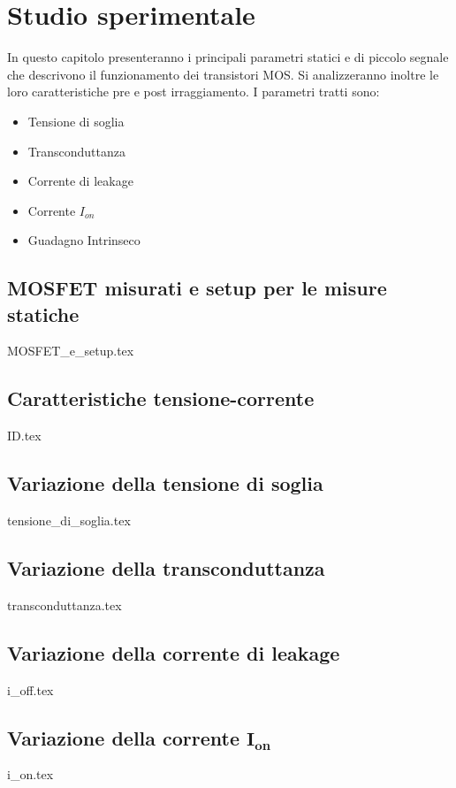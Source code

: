 \documentclass[
	a4paper,
	cleardoublepage=empty,
	headings=twolinechapter,
	numbers=autoenddot,
]{scrbook}
\begin{document}
\chapter{Studio sperimentale}
In questo capitolo presenteranno i principali parametri statici e di piccolo segnale che descrivono il funzionamento dei transistori MOS. Si analizzeranno inoltre le loro caratteristiche pre e post irraggiamento. I parametri tratti sono:
\begin{itemize}
  \item Tensione di soglia
  \item Transconduttanza
  \item Corrente di leakage
  \item Corrente $I_{on}$
  \item Guadagno Intrinseco
\end{itemize}

\section{MOSFET misurati e setup per le misure statiche}
{MOSFET_e_setup.tex}
\FloatBarrier

\section{Caratteristiche tensione-corrente}
{ID.tex}
\FloatBarrier

\section{Variazione della tensione di soglia}
\label{cap2:vth}
{tensione_di_soglia.tex}

\section{Variazione della transconduttanza}\label{sec:transconduttanza}
{transconduttanza.tex}

\section{Variazione della corrente di leakage}
{i_off.tex}

\section[Variazione della corrente $I_{on}$]{Variazione della corrente $\bm{I_{on}}$}
{i_on.tex}
\end{document}

